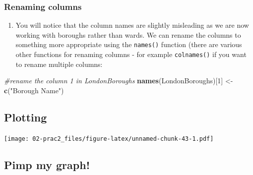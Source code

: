 \documentclass[]{book}
\newenvironment{Shaded}{\begin{snugshade}}{\end{snugshade}}
\newcommand{\CommentTok}[1]{\textcolor[rgb]{0.56,0.35,0.01}{\textit{#1}}}
\newcommand{\DecValTok}[1]{\textcolor[rgb]{0.00,0.00,0.81}{#1}}
\newcommand{\FloatTok}[1]{\textcolor[rgb]{0.00,0.00,0.81}{#1}}
\newcommand{\KeywordTok}[1]{\textcolor[rgb]{0.13,0.29,0.53}{\textbf{#1}}}
\newcommand{\NormalTok}[1]{#1}
\newcommand{\OperatorTok}[1]{\textcolor[rgb]{0.81,0.36,0.00}{\textbf{#1}}}
\newcommand{\StringTok}[1]{\textcolor[rgb]{0.31,0.60,0.02}{#1}}
\providecommand{\tightlist}{%
  \setlength{\itemsep}{0pt}\setlength{\parskip}{0pt}}
\begin{document}
\hypertarget{renaming-columns}{%
\subsubsection{Renaming columns}\label{renaming-columns}}

\begin{enumerate}
\def\labelenumi{\arabic{enumi}.}
\setcounter{enumi}{30}
\tightlist
\item
  You will notice that the column names are slightly misleading as we are now working with boroughs rather than wards. We can rename the columns to something more appropriate using the \texttt{names()} function (there are various other functions for renaming columns - for example \texttt{colnames()} if you want to rename multiple columns:
\end{enumerate}

\begin{Shaded}
\begin{Highlighting}[]
\CommentTok{#rename the column 1 in LondonBoroughs}
\KeywordTok{names}\NormalTok{(LondonBoroughs)[}\DecValTok{1}\NormalTok{] <-}\StringTok{ }\KeywordTok{c}\NormalTok{(}\StringTok{"Borough Name"}\NormalTok{)}
\end{Highlighting}
\end{Shaded}

\hypertarget{plotting}{%
\subsection{Plotting}\label{plotting}}

\begin{Shaded}
\end{Shaded}

\texttt{[image: 02-prac2\_files/figure-latex/unnamed-chunk-43-1.pdf]}

\hypertarget{pimp-my-graph}{%
\subsection{Pimp my graph!}\label{pimp-my-graph}}
\end{document}
